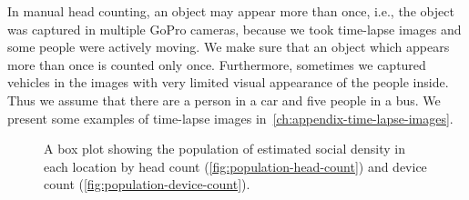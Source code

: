 In manual head counting, an object may appear more than once, i.e., the object was captured in multiple GoPro cameras, because we took time-lapse images and some people were actively moving. We make sure that an object which appears more than once is counted only once. Furthermore, sometimes we captured vehicles in the images with very limited visual appearance of the people inside. Thus we assume that there are a person in a car and five people in a bus. We present some examples of time-lapse images in~\autoref{ch:appendix-time-lapse-images}.

\begin{figure}[h]
	\begin{adjustwidth}{-2cm}{}
	\centering
	\end{adjustwidth}
	\caption{A box plot showing the population of estimated social density in each location by head count (\ref{fig:population-head-count}) and device count (\ref{fig:population-device-count}).}
	\label{fig:total-population}
\end{figure}

